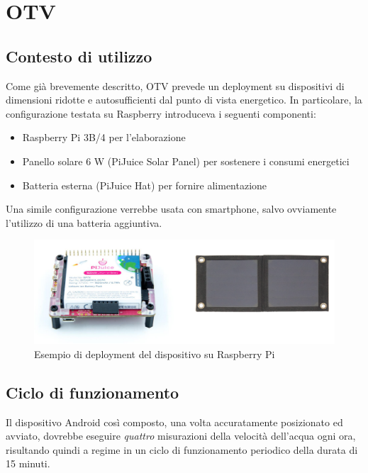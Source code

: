 \chapter{OTV}
\section{Contesto di utilizzo}

Come già brevemente descritto, OTV prevede un deployment su dispositivi di dimensioni ridotte e autosufficienti dal punto di
vista energetico. In particolare, la configurazione testata su Raspberry \cite{app11157027} introduceva i seguenti componenti:
\begin{itemize}
    \item Raspberry Pi 3B/4 per l'elaborazione
    \item Panello solare 6 W (PiJuice Solar Panel) per sostenere i consumi energetici
    \item Batteria esterna (PiJuice Hat) per fornire alimentazione
\end{itemize}
 Una simile configurazione verrebbe usata con smartphone, salvo ovviamente l'utilizzo di una batteria 
aggiuntiva.

\begin{figure}[h!]
    \begin{center}
        \includegraphics[scale=0.15]{img/pijuice.png}
        \caption{Esempio di deployment del dispositivo su Raspberry Pi}
    \end{center}
\end{figure}

\section{Ciclo di funzionamento}
\label{sec:ciclo}

Il dispositivo Android così composto, una volta accuratamente posizionato ed avviato, dovrebbe eseguire \emph{quattro} misurazioni 
della velocità dell'acqua ogni ora, risultando quindi a regime in un ciclo di funzionamento periodico della durata di 15 minuti.

